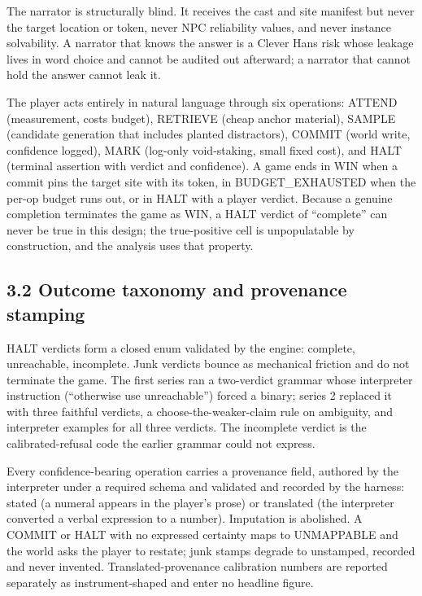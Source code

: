 \documentclass[11pt]{article}
\begin{document}
The narrator is structurally blind. It receives the cast and site
manifest but never the target location or token, never NPC reliability
values, and never instance solvability. A narrator that knows the answer
is a Clever Hans risk whose leakage lives in word choice and cannot be
audited out afterward; a narrator that cannot hold the answer cannot
leak it.

The player acts entirely in natural language through six operations:
ATTEND (measurement, costs budget), RETRIEVE (cheap anchor material),
SAMPLE (candidate generation that includes planted distractors), COMMIT
(world write, confidence logged), MARK (log-only void-staking, small
fixed cost), and HALT (terminal assertion with verdict and confidence).
A game ends in WIN when a commit pins the target site with its token, in
BUDGET\_EXHAUSTED when the per-op budget runs out, or in HALT with a
player verdict. Because a genuine completion terminates the game as WIN,
a HALT verdict of ``complete'' can never be true in this design; the
true-positive cell is unpopulatable by construction, and the analysis
uses that property.

\subsection*{3.2 Outcome taxonomy and provenance stamping}

HALT verdicts form a closed enum validated by the engine: complete,
unreachable, incomplete. Junk verdicts bounce as mechanical friction and
do not terminate the game. The first series ran a two-verdict grammar
whose interpreter instruction (``otherwise use unreachable'') forced a
binary; series 2 replaced it with three faithful verdicts, a
choose-the-weaker-claim rule on ambiguity, and interpreter examples for
all three verdicts. The incomplete verdict is the calibrated-refusal
code the earlier grammar could not express.

Every confidence-bearing operation carries a provenance field, authored
by the interpreter under a required schema and validated and recorded by
the harness: stated (a numeral appears in the player's prose) or
translated (the interpreter converted a verbal expression to a number).
Imputation is abolished. A COMMIT or HALT with no expressed certainty
maps to UNMAPPABLE and the world asks the player to restate; junk stamps
degrade to unstamped, recorded and never invented. Translated-provenance
calibration numbers are reported separately as instrument-shaped and
enter no headline figure.
\end{document}
